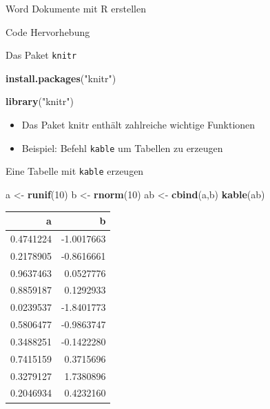 \documentclass[ignorenonframetext,]{beamer}
\newenvironment{Shaded}{}{}
\newcommand{\KeywordTok}[1]{\textcolor[rgb]{0.00,0.44,0.13}{\textbf{{#1}}}}
\newcommand{\DecValTok}[1]{\textcolor[rgb]{0.25,0.63,0.44}{{#1}}}
\newcommand{\StringTok}[1]{\textcolor[rgb]{0.25,0.44,0.63}{{#1}}}
\newcommand{\NormalTok}[1]{{#1}}
\providecommand{\tightlist}{%
\setlength{\itemsep}{0pt}\setlength{\parskip}{0pt}}
\begin{document}
\begin{frame}[fragile]{Word Dokumente mit R erstellen}
\begin{block}{Code Hervorhebung}
\end{block}

\begin{block}{Das Paket \texttt{knitr}}

\begin{Shaded}
\begin{Highlighting}[]
\KeywordTok{install.packages}\NormalTok{(}\StringTok{"knitr"}\NormalTok{)}
\end{Highlighting}
\end{Shaded}

\begin{Shaded}
\begin{Highlighting}[]
\KeywordTok{library}\NormalTok{(}\StringTok{"knitr"}\NormalTok{)}
\end{Highlighting}
\end{Shaded}

\begin{itemize}
\tightlist
\item
  Das Paket knitr enthält zahlreiche wichtige Funktionen
\item
  Beispiel: Befehl \texttt{kable} um Tabellen zu erzeugen
\end{itemize}

\end{block}

\begin{block}{Eine Tabelle mit \texttt{kable} erzeugen}

\begin{Shaded}
\begin{Highlighting}[]
\NormalTok{a <-}\StringTok{ }\KeywordTok{runif}\NormalTok{(}\DecValTok{10}\NormalTok{)}
\NormalTok{b <-}\StringTok{ }\KeywordTok{rnorm}\NormalTok{(}\DecValTok{10}\NormalTok{)}
\NormalTok{ab <-}\StringTok{ }\KeywordTok{cbind}\NormalTok{(a,b)}
\KeywordTok{kable}\NormalTok{(ab)}
\end{Highlighting}
\end{Shaded}

\begin{longtable}[]{@{}rr@{}}
\toprule
a & b\tabularnewline
\midrule
\endhead
0.4741224 & -1.0017663\tabularnewline
0.2178905 & -0.8616661\tabularnewline
0.9637463 & 0.0527776\tabularnewline
0.8859187 & 0.1292933\tabularnewline
0.0239537 & -1.8401773\tabularnewline
0.5806477 & -0.9863747\tabularnewline
0.3488251 & -0.1422280\tabularnewline
0.7415159 & 0.3715696\tabularnewline
0.3279127 & 1.7380896\tabularnewline
0.2046934 & 0.4232160\tabularnewline
\bottomrule
\end{longtable}


\end{block}
\end{frame}
\end{document}
